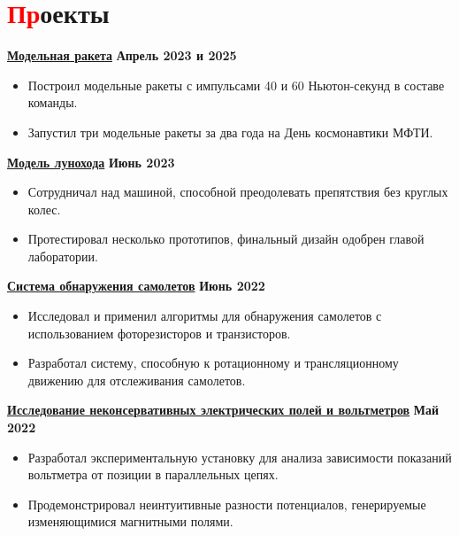 \documentclass[a4paper, 10pt]{article} %
\begin{document}
\section{\textcolor{red}{Пр}оекты}
    {\href{https://github.com/icarus-imperium/rocket-2025}{\textbf{Модельная ракета}}} \hfill \textbf{Апрель 2023 и 2025} \\
    \begin{itemize}
        \vspace{-9pt}
    \item Построил модельные ракеты с импульсами 40 и 60 Ньютон-секунд в составе команды.
        \vspace{-9pt}
    \item Запустил три модельные ракеты за два года на День космонавтики МФТИ.
    \end{itemize}
    \vspace{-9pt}
    {\href{https://github.com/rezaaliasgarirenani/Rover}{\textbf{Модель лунохода}}} \hfill \textbf{Июнь 2023}
    \begin{itemize}
        \vspace{-9pt}
    \item Сотрудничал над машиной, способной преодолевать препятствия без круглых колес.
        \vspace{-9pt}
    \item Протестировал несколько прототипов, финальный дизайн одобрен главой лаборатории.
    \end{itemize}
    \vspace{-9pt}
    {\href{https://github.com/rezaaliasgarirenani/Aircraft-Detection-System}{\textbf{Система обнаружения самолетов}}} \hfill \textbf{Июнь 2022}
    \begin{itemize}
        \vspace{-9pt}
    \item Исследовал и применил алгоритмы для обнаружения самолетов с использованием фоторезисторов и транзисторов.
        \vspace{-9pt}
    \item Разработал систему, способную к ротационному и трансляционному движению для отслеживания самолетов.
    \end{itemize}
    \vspace{-9pt}
    {\href{https://github.com/rezaaliasgarirenani/Non-Conservative-Electric-Fields-and-Voltmeters}{\textbf{Исследование неконсервативных электрических полей и вольтметров}}} \hfill \textbf{Май 2022} \\
    \begin{itemize}
        \vspace{-9pt}
    \item Разработал экспериментальную установку для анализа зависимости показаний вольтметра от позиции в параллельных цепях.
        \vspace{-9pt}
    \item Продемонстрировал неинтуитивные разности потенциалов, генерируемые изменяющимися магнитными полями.
    \end{itemize}
    \vspace{-18pt} %
\end{document}
